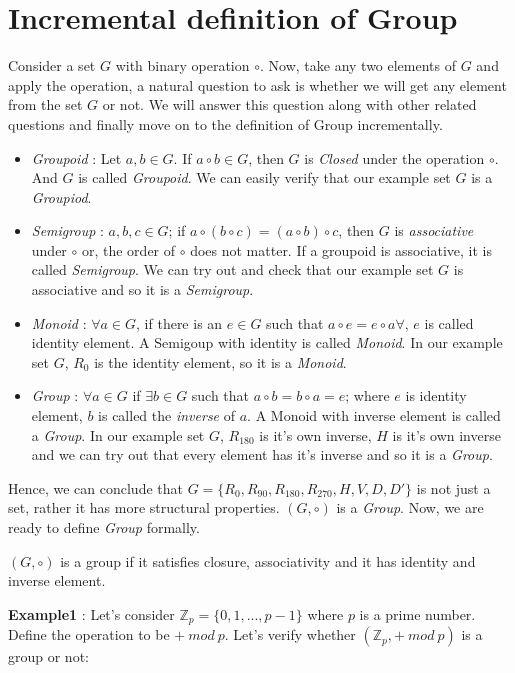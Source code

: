 \section{Incremental definition of Group}
Consider a set $G$ with binary operation $\circ$. Now, take any two elements of $G$ and apply the operation, a natural question to ask is whether we will get any element from the set $G$ or not. We will answer this question along with other related questions and finally move on to the definition of Group incrementally.
\begin{itemize}
\item \emph{Groupoid} : Let $a,b\in G$. If $a\circ b\in G$, then $G$ is \emph{Closed} under the operation $\circ$. And $G$ is called \emph{Groupoid}. We can easily verify that our example set $G$ is a \emph{Groupiod}.
\item \emph{Semigroup} : $a,b,c\in G$; if $a\circ(b\circ c)=(a\circ b)\circ c $, then $G$ is \emph{associative} under $\circ$ or, the order of $\circ$ does not matter. If a groupoid is associative, it is called \emph{Semigroup}. We can try out and check that our example set $G$ is associative and so it is a \emph{Semigroup}.
\item \emph{Monoid} : $\forall a\in G $, if there is an $e\in G$ such that $a\circ e=e\circ a\forall $, $e$ is called identity element. A Semigoup with identity is called \emph{Monoid}. In our example set $G$, $R_0$ is the identity element, so it is a \emph{Monoid}.
\item \emph{Group} : $\forall a\in G$ if $ \exists b\in G $ such that $a\circ b=b\circ a=e $; where $e$ is identity element, $b$ is called the \emph{inverse} of $a$. A Monoid with inverse element is called a \emph{Group}. In our example set $G$, $R_{180}$ is it's own inverse, $H$ is it's own inverse and we can try out that every element has it's inverse and so it is a \emph{Group}.
\end{itemize}
Hence, we can conclude that $G=\{R_0,R_{90},R_{180},R_{270},H,V,D,D'\}  $ is not just a set, rather it has more structural properties. $(G,\circ) $ is a \emph{Group}. Now, we are ready to define \emph{Group} formally.
\begin{definition}
$(G,\circ)$ is a group if it satisfies closure, associativity and it has identity and inverse element.
\end{definition} 
\textbf{Example1} : Let's consider $\mathbb{Z}_p=\{0,1,...,p-1\} $ where $p$ is a prime number. Define the operation to be $+ \  mod \ p $. Let's verify whether $(\mathbb{Z}_p,+ \ mod \ p) $ is a group or not:
